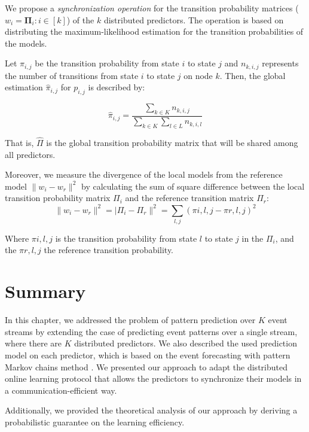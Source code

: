 \par We propose a \textit{synchronization operation} for the transition probability matrices ($w_i=\boldsymbol{\Pi}_i :i \in[k]$) of the $k$ distributed \pmcmr predictors. The operation is based on distributing the maximum-likelihood estimation \cite{anderson1957statistical} for the transition probabilities of the \pmcmr models. 
\par Let $\pi_{i,j}$ be the transition probability from state $i$ to state $j$ 
and $n_{k,i,j}$ represents the number of transitions from state $i$ to state $j$ on node $k$. Then, the global estimation $\hat{\pi}_{i,j}$ for $p_{i,j}$ is described by:

\begin{equation}
\label{eq:dis_pi_estim}
\hat{\pi}_{i,j} = \frac{\sum_{k \in K} n_{k,i,j}}{\sum_{k \in K} \sum_{l \in L} n_{k,i,l}}
\end{equation}

That is,  $\hat{\Pi}$ is the global transition probability matrix that will be shared among all \pmcmr predictors. 
\par Moreover, we measure the divergence of the local models from the reference model $\|w_i - w_r\|^2$ by calculating the sum of square difference between the local transition probability matrix $\Pi_i$ and the reference transition matrix $\Pi_r$:
\begin{equation*}
\label{eq:dis_pi_varinace}
\|w_i - w_r\|^2=|\Pi_i - \Pi_r\|^2=\sum_{l,j} (\pi{i,l,j} -\pi{r,l,j})^2
\end{equation*}

Where $\pi{i,l,j}$ is the transition probability from state $l$ to state $j$ in the $\Pi_i$, and the $\pi{r,l,j}$ the reference transition probability.



\section{Summary}

\par In this chapter, we addressed the problem of pattern prediction over \emph{$K$} event streams by extending the case of predicting  event patterns over a single stream, where there are \emph{$K$} distributed predictors.  We also described the used prediction model on each predictor, which is based on the event forecasting with pattern Markov chains method \cite{alevizos2017event}. We presented our approach to adapt the distributed online learning protocol \cite{kamp2014communication} that allows the predictors to synchronize their models in a communication-efficient way. 
\par Additionally, we provided the theoretical analysis of our approach by deriving a probabilistic guarantee on the learning efficiency. 
 
